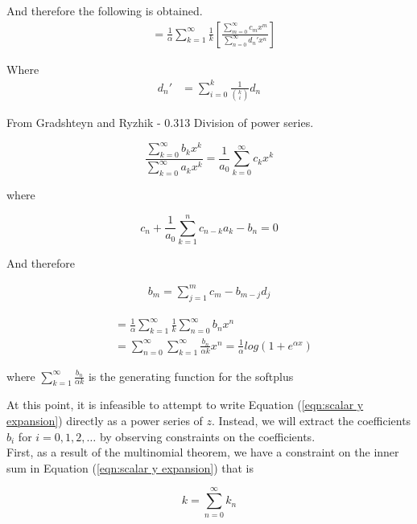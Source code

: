And therefore the following is obtained.
\begin{align*}
	& = \frac{1}{\alpha}\sum\limits_{k=1}^{\infty}\frac{1}{k}\left[ \frac{\sum\limits_{m=0}^{\infty}c_{m}x^{m}}{\sum\limits_{n=0}^{\infty}d_{n}'x^{n}} \right]
\end{align*}

Where
\begin{align*}
 	d_{n}' & = \sum\limits_{i=0}^{k}\frac{1}{{k \choose i}}d_{n}
\end{align*}

From Gradshteyn and Ryzhik - 0.313 Division of power series.

\begin{equation}
	\frac{\sum\limits_{k=0}^{\infty}b_k x^k}{\sum\limits_{k=0}^{\infty}a_k x^k}
	= \frac{1}{a_0}\sum\limits_{k=0}^{\infty}c_kx^k
\end{equation}

where

\begin{equation}
	c_n + \frac{1}{a_0}\sum\limits_{k=1}^n c_{n-k}a_k - b_n = 0
\end{equation}

And therefore

\begin{align*}
	b_{m} = \sum\limits_{j=1}^{m}c_{m}-b_{m-j}d_{j}
\end{align*}

\begin{align*}
	& = \frac{1}{\alpha}\sum\limits_{k=1}^{\infty}\frac{1}{k}\sum\limits_{n=0}^{\infty}b_{n}x^{n} \\
	& = \sum\limits_{n=0}^{\infty}\sum\limits_{k=1}^{\infty}\frac{b_{n}}{\alpha k}x^{n}=\frac{1}{\alpha}log(1+e^{\alpha x})
\end{align*}

where $\sum\limits_{k=1}^{\infty}\frac{b_{n}}{\alpha k}$ is the generating function for the softplus

At this point, it is infeasible to attempt to write Equation (\ref{eqn:scalar y expansion}) directly as a power series of $z$. Instead, we will extract the coefficients $b_i$ for $i = 0, 1, 2, \ldots$ by observing constraints on the coefficients.\\

First, as a result of the multinomial theorem, we have a constraint on the inner sum in Equation (\ref{eqn:scalar y expansion}) that is

\begin{equation}
	k = \sum_{n=0}^{\infty} k_n
	\label{eqn:scalar index constraint}
\end{equation}

